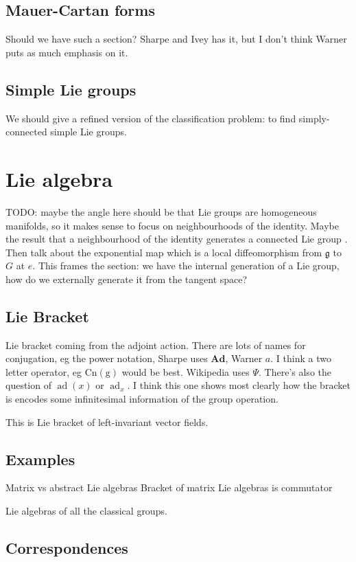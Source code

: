\documentclass[twoside,11pt,a4paper,leqno]{article}
\numberwithin{equation}{section}
\theoremstyle{plain}
\theoremstyle{definition}
\DeclareMathOperator{\ad}{ad}
\newcommand{\frg}{\mathfrak{g}}
\begin{document}
\subsection{Mauer-Cartan forms}
Should we have such a section? Sharpe and Ivey has it, but I don't think Warner puts as much emphasis on it.


\subsection{Simple Lie groups}
We should give a refined version of the classification problem: to find simply-connected simple Lie groups.



\section{Lie algebra}

TODO: maybe the angle here should be that Lie groups are homogeneous manifolds, so it makes sense to focus on neighbourhoods of the identity.
Maybe the result that a neighbourhood of the identity generates a connected Lie group \cite[3.18]{Warner1983}.
Then talk about the exponential map which is a local diffeomorphism from $\frg$ to $G$ at $e$.
This frames the section: we have the internal generation of a Lie group, how do we externally generate it from the tangent space?

\subsection{Lie Bracket}
Lie bracket coming from the adjoint action.
There are lots of names for conjugation, eg the power notation, Sharpe uses $\mathbf{Ad}$, Warner $a$. I think a two letter operator, eg $\operatorname{Cn(g)}$ would be best. Wikipedia uses $\Psi$. There's also the question of $\ad(x)$ or $\ad_x$.
I think this one shows most clearly how the bracket is encodes some infinitesimal information of the group operation.

This is Lie bracket of left-invariant vector fields.


\subsection{Examples}
Matrix vs abstract Lie algebras
Bracket of matrix Lie algebras is commutator

Lie algebras of all the classical groups.


\subsection{Correspondences}
\end{document}
